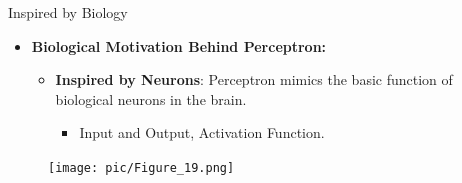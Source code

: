 \documentclass[serif, aspectratio=169]{beamer}
\begin{document}
    \begin{frame}{Inspired by Biology}
        \begin{itemize}
            \item \textbf{Biological Motivation Behind Perceptron:}
            \medskip
            \begin{itemize}\itemsep1em
            \item \justifying \textbf{Inspired by Neurons}:
            Perceptron mimics the basic function of biological neurons in the brain.
            \begin{itemize}
                \item \justifying Input and Output, Activation Function.
            \end{itemize}
            \end{itemize}
        \end{itemize}
        \begin{figure}
            \centering
            \texttt{[image: pic/Figure\_19.png]}
        \end{figure}
        \vfill
    \end{frame}
\end{document}
